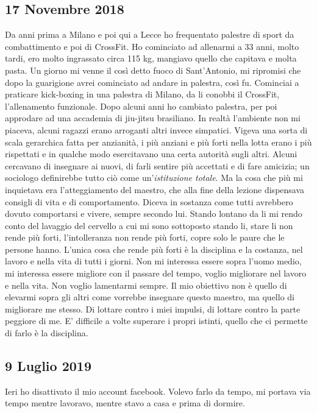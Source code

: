 \subsection{17 Novembre 2018}
Da anni prima a Milano e poi qui a Lecce ho frequentato palestre di sport da combattimento e poi di CrossFit. Ho cominciato ad allenarmi a 33 anni, molto tardi, ero molto ingrassato circa 115 kg, mangiavo quello che capitava e molta pasta. Un giorno mi venne il così detto fuoco di Sant'Antonio, mi ripromisi che dopo la guarigione avrei cominciato ad andare in palestra, così fu. Cominciai a praticare kick-boxing in una palestra di Milano, da li conobbi il CrossFit, l'allenamento funzionale. Dopo alcuni anni ho cambiato palestra, per poi approdare ad una accademia di jiu-jitsu brasiliano.
In realtà l'ambiente non mi piaceva, alcuni ragazzi erano arroganti altri invece simpatici. Vigeva una sorta di scala gerarchica fatta per anzianità, i più anziani e più forti nella lotta erano i più rispettati e in qualche modo esercitavano una certa autorità sugli altri. Alcuni cercavano di insegnare ai nuovi, di farli sentire più accettati e di fare amicizia; un sociologo definirebbe tutto ciò come un'\emph{istituzione totale}.\newline
Ma la cosa che più mi inquietava era l'atteggiamento del maestro, che alla fine della lezione dispensava consigli di vita e di comportamento. Diceva in sostanza come tutti avrebbero dovuto comportarsi e vivere, sempre secondo lui. Stando lontano da li mi rendo conto del lavaggio del cervello a cui mi sono sottoposto stando li, stare li non rende  più forti, l'intolleranza non rende più forti, copre solo le paure che le persone hanno. L'unica cosa che rende più forti è la disciplina e la costanza, nel lavoro e nella vita di tutti i giorni.\newline
Non mi interessa essere sopra l'uomo medio, mi interessa essere migliore con il passare del tempo, voglio migliorare nel lavoro e nella vita. Non voglio lamentarmi sempre.\newline
Il mio obiettivo non è quello di elevarmi sopra gli altri come vorrebbe insegnare questo maestro, ma quello di migliorare me stesso. Di lottare contro i miei impulsi, di lottare contro la parte peggiore di me.
E' difficile a volte superare i propri istinti, quello che ci permette di farlo è la disciplina.
\subsection{9 Luglio 2019}
Ieri ho disattivato il mio account facebook. Volevo farlo da tempo, mi portava via tempo mentre lavoravo, mentre stavo a casa e prima di dormire.
